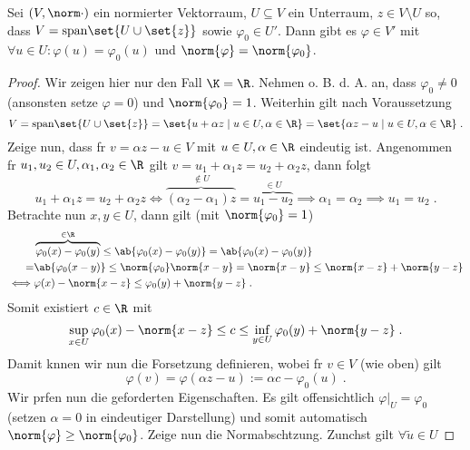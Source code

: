	\begin{lemma}
		Sei \((V,\norm\cdot)\) ein normierter Vektorraum, \(U\subseteq V\) ein Unterraum, \(z \in V\setminus U\) so, dass \(V = \text{span}\set{U \cup \set{z}}\) sowie \(\varphi_0 \in U'\). Dann gibt es \(\varphi \in V'\) mit \(\forall u \in U: \varphi(u) = \varphi_0(u)\) und \(\norm{\varphi} = \norm{\varphi_0}\).
		\label{Lemma_Hahn_Banach}
	\end{lemma}
	\begin{proof}
		Wir zeigen hier nur den Fall \(\K = \R\). Nehmen o. B. d. A. an, dass \(\varphi_0 \neq 0\) (ansonsten setze \(\varphi = 0\)) und \(\norm{\varphi_0} = 1\). Weiterhin gilt nach Voraussetzung
		\[V = \text{span}\set{U\cup\set{z}} = \set{u + \alpha z \;\vert\; u \in U, \alpha \in \R} = \set{\alpha z - u \;\vert\; u \in U, \alpha\in \R}\;.\]
		Zeige nun, dass f\us r \(v = \alpha z - u \in V\) mit \(u\in U, \alpha \in \R\) eindeutig ist. Angenommen f\us r \(u_1, u_2 \in U, \alpha_1, \alpha_2 \in \R\) gilt \(v = u_1 + \alpha_1 z = u_2 + \alpha_2 z\), dann folgt
		\[u_1 + \alpha_1 z = u_2 + \alpha_2 z \iff \overbrace{(\alpha_2 - \alpha_1)z}^{\not\in U} = \overbrace{u_1 - u_2}^{\in U}\implies \alpha_1 = \alpha_2 \implies u_1 = u_2\;.\]
		Betrachte nun \(x,y \in U\), dann gilt (mit \(\norm{\varphi_0} = 1\))
		\begin{align*}&\overbrace{\varphi_0(x) -\varphi_0(y)}^{\in \R} \leq \ab{\varphi_0(x) -\varphi_0(y)} = \ab{\varphi_0(x) -\varphi_0(y)} \\= &\ab{\varphi_0(x-y)} \leq \norm{\varphi_0} \norm{x-y}  
			= \norm{x-y} \leq \norm{x-z} + \norm{y-z} \\ \iff &\varphi(x) - \norm{x-z} \leq \varphi_0(y) + \norm{y-z}\;.
			\end{align*}
			Somit existiert \(c\in \R\) mit 
			\[\sup_{x\in U}\varphi_0(x) - \norm{x-z}\leq c \leq \inf_{y\in U} \varphi_0(y) + \norm{y-z}\;.\]
			Damit k\os nnen wir nun die Forsetzung definieren, wobei f\us r \(v \in V\) (wie oben) gilt
			\[\varphi(v) = \varphi(\alpha z - u) := \alpha c - \varphi_0(u)\;.\]
			Wir pr\us fen nun die geforderten Eigenschaften. Es gilt offensichtlich \(\varphi\vert_U = \varphi_0\) (setzen \(\alpha = 0\) in eindeutiger Darstellung) und somit automatisch 
			\(\norm{\varphi} \geq \norm{\varphi_0}\). Zeige nun die Normabsch\as tzung. Zun\as chst gilt  \(\forall\tilde u \in U\)

\end{proof}
